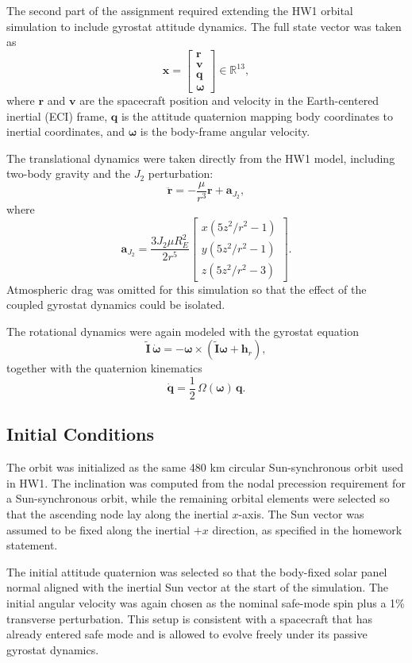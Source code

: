 \documentclass[12pt]{article}
\begin{document}
The second part of the assignment required extending the HW1 orbital simulation to
include gyrostat attitude dynamics. The full state vector was taken as
\[
\mathbf{x}
=
\begin{bmatrix}
\mathbf{r} \\
\mathbf{v} \\
\mathbf{q} \\
\boldsymbol{\omega}
\end{bmatrix}
\in \mathbb{R}^{13},
\]
where $\mathbf{r}$ and $\mathbf{v}$ are the spacecraft position and velocity in the
Earth-centered inertial (ECI) frame, $\mathbf{q}$ is the attitude quaternion mapping
body coordinates to inertial coordinates, and $\boldsymbol{\omega}$ is the body-frame
angular velocity.

The translational dynamics were taken directly from the HW1 model, including
two-body gravity and the $J_2$ perturbation:
\[
\ddot{\mathbf{r}}
=
-\frac{\mu}{r^3}\mathbf{r}
+
\mathbf{a}_{J_2},
\]
where
\[
\mathbf{a}_{J_2}
=
\frac{3J_2\mu R_E^2}{2r^5}
\begin{bmatrix}
x\left(5z^2/r^2 - 1\right) \\
y\left(5z^2/r^2 - 1\right) \\
z\left(5z^2/r^2 - 3\right)
\end{bmatrix}.
\]
Atmospheric drag was omitted for this simulation so that the effect of the coupled
gyrostat dynamics could be isolated.

The rotational dynamics were again modeled with the gyrostat equation
\[
\widetilde{\mathbf{I}}\,\dot{\boldsymbol{\omega}}
=
-\boldsymbol{\omega}\times
\left(
\widetilde{\mathbf{I}}\boldsymbol{\omega} + \mathbf{h}_r
\right),
\]
together with the quaternion kinematics
\[
\dot{\mathbf{q}}
=
\frac{1}{2}\,\Omega(\boldsymbol{\omega})\,\mathbf{q}.
\]

\subsection{Initial Conditions}

The orbit was initialized as the same 480 km circular Sun-synchronous orbit used in
HW1. The inclination was computed from the nodal precession requirement for a
Sun-synchronous orbit, while the remaining orbital elements were selected so that
the ascending node lay along the inertial $x$-axis. The Sun vector was assumed to
be fixed along the inertial $+x$ direction, as specified in the homework statement.

The initial attitude quaternion was selected so that the body-fixed solar panel
normal aligned with the inertial Sun vector at the start of the simulation. The
initial angular velocity was again chosen as the nominal safe-mode spin plus a 1\%
transverse perturbation. This setup is consistent with a spacecraft that has already
entered safe mode and is allowed to evolve freely under its passive gyrostat
dynamics.
\end{document}
